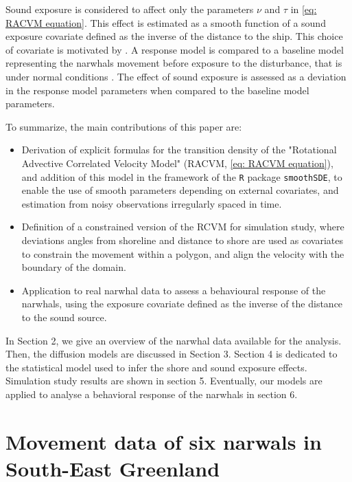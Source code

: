 \documentclass[11pt]{article}
\newcommand {\1}{\mathbb{1}}
\theoremstyle{definition}
\theoremstyle{remark}
\theoremstyle{remark}
\begin{document}
Sound exposure is considered to affect only the parameters $\nu$ and $\tau$ in \eqref{eq: RACVM equation}. This effect is estimated as a smooth function of a sound exposure covariate defined as the inverse of the distance to the ship. This choice of covariate is motivated by \cite{heide-jorgensen_behavioral_2021}. A response model is compared to a baseline model representing the narwhals movement before exposure to the disturbance, that is under normal conditions \cite{michelot_continuous-time_2022}.
The effect of sound exposure is assessed as a deviation in the response model parameters when compared to the baseline model parameters.



To summarize, the main contributions of this paper are:
\begin{itemize}
	\item Derivation of explicit formulas for the transition density of the "Rotational Advective Correlated Velocity Model" (RACVM, \eqref{eq: RACVM equation}), and addition of this model in the framework of  the \texttt{R} package \texttt{smoothSDE}, to enable the use of smooth parameters depending on external covariates, and estimation from noisy observations irregularly spaced in time.
	\item Definition of a constrained version of the RCVM for simulation study, where deviations angles from shoreline and distance to shore are used as covariates to constrain the movement within a polygon, and align the velocity with the boundary of the domain.
	\item Application to real narwhal data to assess a behavioural response of the narwhals, using the exposure covariate defined as the inverse of the distance to the sound source.
\end{itemize}

In Section 2, we give an overview of the narwhal data available for the analysis.
Then, the diffusion models are discussed in Section 3. Section 4 is dedicated to the statistical model used to infer the shore and sound exposure effects. Simulation study results are shown in section 5. Eventually, our models are applied to analyse a behavioral response of the narwhals in section 6.





\section{Movement data of six narwals in South-East Greenland}
\end{document}
